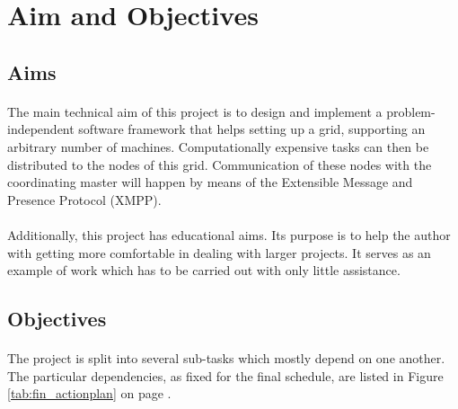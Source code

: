 \section{Aim and Objectives}

\subsection{Aims}
\paragraph{}
The main technical aim of this project is to design and implement a prob\-lem-in\-de\-pen\-dent software framework that helps setting up a grid, supporting an arbitrary number of machines. Computationally expensive tasks can then be distributed to the nodes of this grid. Communication of these nodes with the coordinating master will happen by means of the Extensible Message and Presence Protocol (XMPP).
\paragraph{}
Additionally, this project has educational aims. Its purpose is to help the author with getting more comfortable in dealing with larger projects. It serves as an example of work which has to be carried out with only little assistance.

\subsection{Objectives}
\paragraph{}
The project is split into several sub-tasks which mostly depend on one another. The particular dependencies, as fixed for the final schedule, are listed in Figure \ref{tab:fin_actionplan} on page \pageref{tab:fin_actionplan}.

